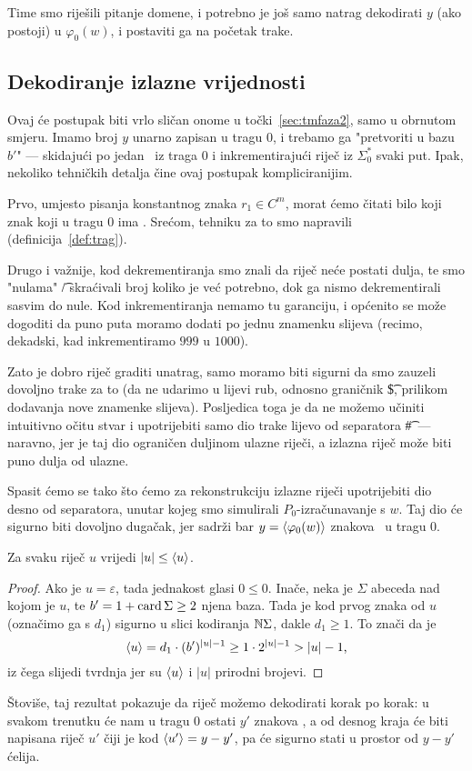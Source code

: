 Time smo riješili pitanje domene, i potrebno je još samo natrag dekodirati $y$ (ako postoji) u $\varphi_0(w)$, i postaviti ga na početak trake.

\subsection{Dekodiranje izlazne vrijednosti}

Ovaj će postupak biti vrlo sličan onome u točki~\ref{sec:tmfaza2}, samo u obrnutom smjeru. Imamo broj $y$ unarno zapisan u tragu $0$, i trebamo ga "pretvoriti u bazu $b'$" --- skidajući po jedan \textbullet\ iz traga $0$ i inkrementirajući riječ iz $\Sigma_0^*$ svaki put. Ipak, nekoliko tehničkih detalja čine ovaj postupak kompliciranijim.

Prvo, umjesto pisanja konstantnog znaka $r_1\in C^m$, morat ćemo čitati bilo koji znak koji u tragu $0$ ima \textbullet. Srećom, tehniku za to smo napravili (definicija~\ref{def:trag}).

Drugo i važnije, kod dekrementiranja smo znali da riječ neće postati dulja, te smo "nulama" \t/ skraćivali broj koliko je već potrebno, dok ga nismo dekrementirali sasvim do nule. Kod inkrementiranja nemamo tu garanciju, i općenito se može dogoditi da puno puta moramo dodati po jednu znamenku slijeva (recimo, dekadski, kad inkrementiramo $999$ u $1000$).

Zato je dobro riječ graditi unatrag, samo moramo biti sigurni da smo zauzeli dovoljno trake za to (da ne udarimo u lijevi rub, odnosno graničnik \t\$, prilikom dodavanja nove znamenke slijeva). Posljedica toga je da ne možemo učiniti intuitivno očitu stvar i upotrijebiti samo dio trake lijevo od separatora \t\#\ --- naravno, jer je taj dio ograničen duljinom ulazne riječi, a izlazna riječ može biti puno dulja od ulazne.

Spasit ćemo se tako što ćemo za rekonstrukciju izlazne riječi upotrijebiti dio desno od separatora, unutar kojeg smo simulirali $P_0$-izračunavanje s $w$. Taj dio će sigurno biti dovoljno dugačak, jer sadrži bar $y=\langle\varphi_0(w)\rangle$ znakova \textbullet\ u tragu $0$.

\begin{lema}
Za svaku riječ $u$ vrijedi $\left|u\right|\le\langle u\rangle$.
\end{lema}
\begin{proof}
Ako je $u=\varepsilon$, tada jednakost glasi $0\le 0$. Inače, neka je $\Sigma$ abeceda nad kojom je $u$, te $b'=1+\operatorname{card}\Sigma\ge2$ njena baza. Tada je kod prvog znaka od $u$ (označimo ga s $d_1$) sigurno u slici kodiranja ${\mathbb N}\Sigma$, dakle $d_1\ge 1$. To znači da je
\begin{equation}
    \langle u\rangle=d_1\cdot (b')^{\left|u\right|-1}\ge1\cdot2^{\left|u\right|-1}>\left|u\right|-1\text,
\end{equation}
iz čega slijedi tvrdnja jer su $\langle u\rangle$ i $\left|u\right|$ prirodni brojevi.
\end{proof}

Štoviše, taj rezultat pokazuje da riječ možemo dekodirati korak po korak: u svakom trenutku će nam u tragu $0$ ostati $y'$ znakova \textbullet, a od desnog kraja će biti napisana riječ $u'$ čiji je kod $\langle u'\rangle=y-y'$, pa će sigurno stati u prostor od $y-y'$ ćelija.